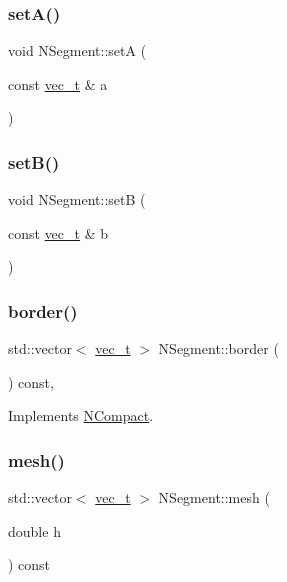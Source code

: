 \subsubsection{\texorpdfstring{setA()}{setA()}}
{\footnotesize\ttfamily void N\+Segment\+::setA (\begin{DoxyParamCaption}\item[{const \mbox{\hyperlink{_n_vector_8h_a0a2cfc67e738a3d73e4f12098c4c07f6}{vec\+\_\+t}} \&}]{a }\end{DoxyParamCaption})}

\mbox{\label{class_n_segment_a02094cbbe46d7c647299ecdde05ce592}} 
\subsubsection{\texorpdfstring{setB()}{setB()}}
{\footnotesize\ttfamily void N\+Segment\+::setB (\begin{DoxyParamCaption}\item[{const \mbox{\hyperlink{_n_vector_8h_a0a2cfc67e738a3d73e4f12098c4c07f6}{vec\+\_\+t}} \&}]{b }\end{DoxyParamCaption})}

\mbox{\label{class_n_segment_a0ef102ed1c0751ae4a9a2e52bf0736da}} 
\subsubsection{\texorpdfstring{border()}{border()}}
{\footnotesize\ttfamily std\+::vector$<$ \mbox{\hyperlink{_n_vector_8h_a0a2cfc67e738a3d73e4f12098c4c07f6}{vec\+\_\+t}} $>$ N\+Segment\+::border (\begin{DoxyParamCaption}{ }\end{DoxyParamCaption}) const\hspace{0.3cm}{\ttfamily [override]}, {\ttfamily [virtual]}}



Implements \mbox{\hyperlink{class_n_compact_af7acc50099e80fc13ce32c97e6857308}{N\+Compact}}.

\mbox{\label{class_n_segment_a49473aeaa477736a7863e60607e045e0}} 
\subsubsection{\texorpdfstring{mesh()}{mesh()}\hspace{0.1cm}{\footnotesize\ttfamily [1/2]}}
{\footnotesize\ttfamily std\+::vector$<$ \mbox{\hyperlink{_n_vector_8h_a0a2cfc67e738a3d73e4f12098c4c07f6}{vec\+\_\+t}} $>$ N\+Segment\+::mesh (\begin{DoxyParamCaption}\item[{double}]{h }\end{DoxyParamCaption}) const}

